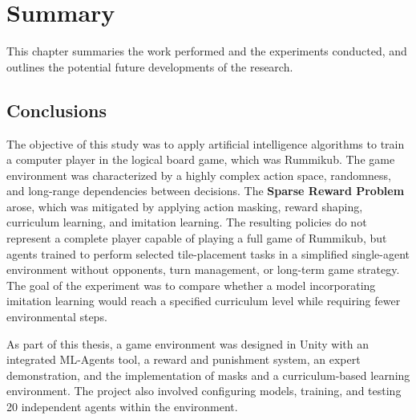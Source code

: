 \chapter{Summary}
\label{chapt::sum}
This chapter summaries the work performed and the experiments conducted, and outlines the potential future developments of the research.

\section{Conclusions}

The objective of this study was to apply artificial intelligence algorithms to train a computer player in the logical board game, which was Rummikub. The game environment was characterized by a highly complex action space, randomness, and long-range dependencies between decisions. The \textbf{Sparse Reward Problem} arose, which was mitigated by applying action masking, reward shaping, curriculum learning, and imitation learning. 
The resulting policies do not represent a complete player capable of playing a full game of Rummikub, but agents trained to perform selected tile-placement tasks in a simplified single-agent environment without opponents, turn management, or long-term game strategy. The goal of the experiment was to compare whether a model incorporating imitation learning would reach a specified curriculum level while requiring fewer environmental steps.

As part of this thesis, a game environment was designed in Unity with an integrated ML-Agents tool, a reward and punishment system, an expert demonstration, and the implementation of masks and a curriculum-based learning environment. The project also involved configuring models, training, and testing 20 independent agents within the environment.

